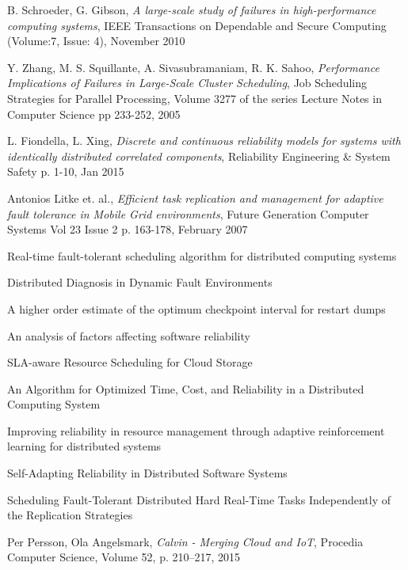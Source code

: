 \documentclass{cslthse-msc}
\begin{document}
\begin{thebibliography}{50}
	B. Schroeder, G. Gibson,
	\emph{A large-scale study of failures in high-performance computing systems},
	IEEE Transactions on Dependable and Secure Computing (Volume:7, Issue: 4),
	November 2010

	Y. Zhang, M. S. Squillante, A. Sivasubramaniam, R. K. Sahoo,
	\emph{Performance Implications of Failures in Large-Scale Cluster Scheduling},
	Job Scheduling Strategies for Parallel Processing, Volume 3277 of the series Lecture Notes in Computer Science pp 233-252,
	2005

	L. Fiondella, L. Xing,
	\emph{Discrete and continuous reliability models for systems with identically distributed correlated components},
	Reliability Engineering \& System Safety p. 1-10,
	Jan 2015

	Antonios Litke et. al.,	
	\emph{Efficient task replication and management for adaptive fault tolerance in Mobile Grid environments},
	Future Generation Computer Systems Vol 23 Issue 2 p. 163-178,
	February 2007

Real-time fault-tolerant scheduling algorithm for distributed computing systems

Distributed Diagnosis in Dynamic Fault Environments

A higher order estimate of the optimum checkpoint interval for restart dumps

An analysis of factors affecting software reliability

SLA-aware Resource Scheduling for Cloud Storage

An Algorithm for Optimized Time, Cost, and Reliability in a Distributed Computing System

Improving reliability in resource management through adaptive reinforcement learning for distributed systems

Self-Adapting Reliability in Distributed Software Systems

Scheduling Fault-Tolerant Distributed Hard Real-Time Tasks Independently of the Replication Strategies

	Per Persson, Ola Angelsmark,
	\emph{Calvin - Merging Cloud and IoT},
	Procedia Computer Science, Volume 52, p. 210–217,
	2015


\end{thebibliography}
\end{document}
